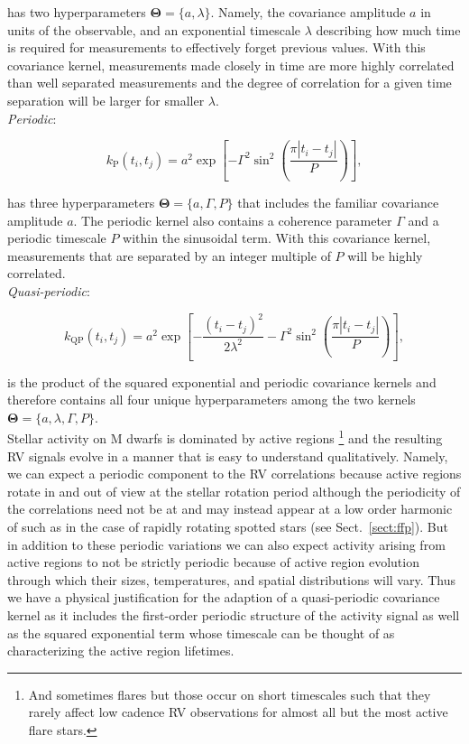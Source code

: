 \noindent has two hyperparameters $\boldsymbol{\Theta}=\{a, \lambda \}$.
Namely, the covariance amplitude $a$ in units of the observable,
and an exponential timescale $\lambda$ describing how much time is required for measurements to
effectively forget previous values. With this covariance kernel, measurements made closely in time
are more highly correlated than well separated measurements and the degree of correlation for a
given time separation will be larger for smaller $\lambda$. \\

\emph{Periodic}:

\begin{equation}
  k_{\text{P}}(t_i,t_j) = a^2 \exp{\left[ -\Gamma^2 \sin^2{\left( \frac{\pi |t_i-t_j|}{P} \right)} \right]},
\end{equation}

\noindent has three hyperparameters  $\boldsymbol{\Theta}=\{a, \Gamma, P \}$
that includes the familiar covariance amplitude $a$. The periodic kernel
also contains a coherence parameter $\Gamma$ and a periodic timescale $P$ within the sinusoidal term.
With this covariance kernel, measurements that are separated by an integer multiple of $P$ will be highly
correlated. \\

\emph{Quasi-periodic}:

\begin{equation}
  k_{\text{QP}}(t_i,t_j) = a^2 \exp{\left[ -\frac{(t_i-t_j)^2}{2\lambda^2} -\Gamma^2
      \sin^2{\left( \frac{\pi |t_i-t_j|}{P} \right)} \right]},
  \label{eq:GpQp}
\end{equation}

\noindent is the product of the squared exponential and periodic covariance kernels and therefore
contains all four unique hyperparameters among the two kernels
$\boldsymbol{\Theta}=\{a, \lambda, \Gamma, P \}$. \\

Stellar activity on M dwarfs
is dominated by active regions \citep{lindegren03}\footnote{And sometimes flares but those
  occur on short timescales such that they rarely affect low cadence RV observations for almost
  all but the most active flare stars.} and the resulting RV signals evolve in a manner that
is easy to understand qualitatively. Namely, we can expect a periodic component to the
RV correlations because active regions rotate in and out of view at the stellar rotation period
although the periodicity of the correlations need not be at \prot{} and may instead appear
at a low order harmonic of \prot{} such as in the case of rapidly rotating spotted stars 
(see Sect.~\ref{sect:ffp}). But in addition to these periodic variations we can also expect activity
arising from active regions to not be strictly periodic because of active region evolution through
which their sizes, temperatures, and spatial distributions will vary. Thus we
have a physical justification for the adaption of a
quasi-periodic covariance kernel as it includes the first-order periodic structure of the activity
signal as well as the squared exponential term
whose timescale can be thought of as characterizing the active region lifetimes. \\

